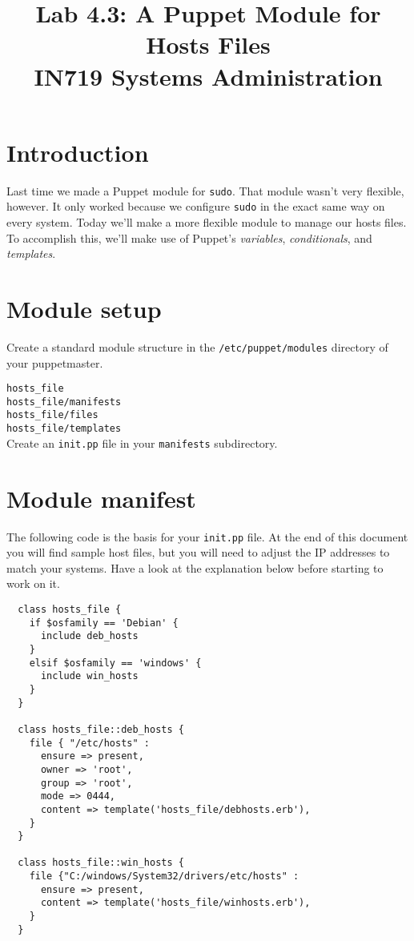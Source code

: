 \documentclass{article}   	%
\title{Lab 4.3: A Puppet Module for Hosts Files \\ IN719 Systems Administration}
\date{}							%
\begin{document}
\maketitle


\section*{Introduction}
Last time we made a Puppet module for \texttt{sudo}.  That module wasn't very flexible, however.  It only worked because we configure \texttt{sudo} in the exact same way on every system. Today we'll make a more flexible module to manage our hosts files.  To accomplish this, we'll make use of Puppet's \emph{variables}, \emph{conditionals}, and \emph{templates}.

\section{Module setup}
Create a standard module structure in the \texttt{/etc/puppet/modules} directory of your puppetmaster.

\texttt{hosts\_file} \\
\texttt{hosts\_file/manifests} \\
\texttt{hosts\_file/files} \\
\texttt{hosts\_file/templates} \\

Create an \texttt{init.pp} file in your \texttt{manifests} subdirectory.

\section{Module manifest}
The following code is the basis for your \texttt{init.pp} file. At the end of this document you will find sample host files, but you will need to adjust the IP addresses to match your systems. Have a look at the explanation below before starting to work on it.

\begin{verbatim}
  class hosts_file {
    if $osfamily == 'Debian' {
      include deb_hosts
    }
    elsif $osfamily == 'windows' {
      include win_hosts
    }
  }

  class hosts_file::deb_hosts {
    file { "/etc/hosts" :
      ensure => present,
      owner => 'root',
      group => 'root',
      mode => 0444,
      content => template('hosts_file/debhosts.erb'),
    }
  }

  class hosts_file::win_hosts {
    file {"C:/windows/System32/drivers/etc/hosts" :
      ensure => present,
      content => template('hosts_file/winhosts.erb'),
    }
  }
  
\end{verbatim}
\end{document}
